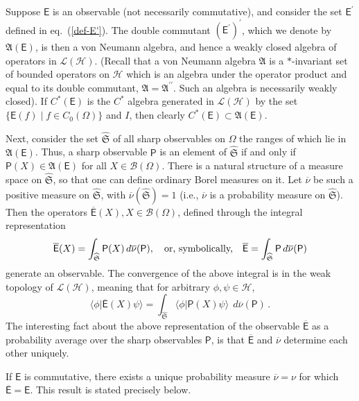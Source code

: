 \documentclass[12pt]{amsart}
\theoremstyle{definition}
\newcommand{\h}{\mathcal{H}}
\newcommand{\hi}{\mathcal{H}} %
\newcommand{\lh}{\mathcal{L(H)}} %
\newcommand{\Eo}{\mathsf{E}} %
\newcommand{\PP}{\mathsf{P}} %
\newcommand{\bor}[1]{\mathcal{B}(#1)} %
\newcommand{\de}{\, d}
\begin{document}
Suppose $\Eo$ is an observable (not necessarily commutative), and consider the set $\Eo^\prime$ defined in eq.~(\ref{def-E'}). The double commutant $(\Eo^\prime)^\prime$, which we denote by ${\mathfrak A}  (\Eo)$, is  then a von Neumann algebra, and hence a weakly closed algebra of operators in $\lh$. (Recall that a von Neumann algebra $\mathfrak A$ is a
$\ast$-invariant set of bounded operators on $\hi$ which is an algebra under the operator
product and equal to its double commutant, ${\mathfrak A} = {\mathfrak A}^{\prime \prime}$. Such an
algebra is necessarily weakly closed). If $C^\ast (\Eo)$ is the $C^\ast$ algebra generated in $\lh$ by the set $\{ \Eo (f) \mid f\in C_0 (\Omega) \}$ and $I$, then clearly $C^\ast (\Eo) \subset {\mathfrak A}  (\Eo)$.

Next, consider the set $\widehat{\mathfrak S}$ of all sharp observables on $\Omega$ the ranges of which lie in ${\mathfrak A}  (\Eo)$. Thus, a sharp observable $\PP$ is an element of $\widehat{\mathfrak S}$ if and only if
$\PP(X )\in {\mathfrak A}  (\Eo)$ for all $X \in \bor{\Omega}$. There is a natural structure of a measure space on $\widehat{\mathfrak S}$, so that one can define ordinary Borel measures on it. Let $\overline{\nu}$ be such a positive measure on
$\widehat{\mathfrak S}$, with $\overline{\nu}(\widehat{\mathfrak S}  ) = 1$ (i.e., $\overline{\nu}$ is a probability
measure on $\widehat{\mathfrak S}  $). Then the operators $\overline{\Eo}(X ), X
\in \bor{\Omega}$, defined through the integral representation
\begin{equation*}
\overline{\Eo}(X) = \int_{\widehat{\mathfrak S}  }\PP(X)\de\overline{\nu}(\PP),
\quad \mbox{\rm or, symbolically,} \quad
\overline{\Eo} = \int_{\widehat{\mathfrak S}}\PP\de\overline{\nu}(\PP)
\end{equation*}
generate an observable. The convergence of the
above integral is in the weak topology of $\lh$, meaning that for arbitrary $\phi,\psi\in\h$,
\begin{equation*}
   \langle\phi\vert\overline{\Eo}(X )\psi\rangle =
   \int_{\widehat{\mathfrak S}  }\langle\phi\vert \PP(X )\psi\rangle\;
			     \de\overline{\nu}(\PP) \, .
\end{equation*}
The interesting fact about the above representation of the observable $\overline{\Eo}$ as a probability average over the sharp observables $\PP$, is that $\overline{\Eo}$ and $\overline{\nu}$ determine each other uniquely.

If $\Eo$ is commutative, there exists a unique probability measure $\overline{\nu}=\nu$ for which
$\overline{\Eo}= \Eo$. This result is stated precisely below.
\end{document}
